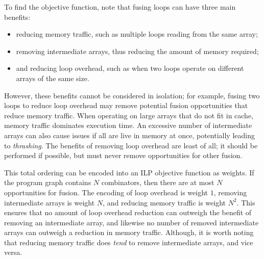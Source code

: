To find the objective function, note that fusing loops can have three main benefits:
\begin{itemize}
\item
reducing memory traffic, such as multiple loops reading from the same array;
\item
removing intermediate arrays, thus reducing the amount of memory required;
\item
and reducing loop overhead, such as when two loops operate on different arrays of the same size.
\end{itemize}
However, these benefits cannot be considered in isolation; for example, fusing two loops to reduce loop overhead may remove potential fusion opportunities that reduce memory traffic.
When operating on large arrays that do not fit in cache, memory traffic dominates execution time.
An excessive number of intermediate arrays can also cause issues if all are live in memory at once, potentially leading to \emph{thrashing}.
The benefits of removing loop overhead are least of all; it should be performed if possible, but must never remove opportunities for other fusion. 

This total ordering can be encoded into an ILP objective function as weights.
If the program graph contains $N$ combinators, then there are at most $N$ opportunities for fusion.
The encoding of loop overhead is weight $1$, removing intermediate arrays is weight $N$, and reducing memory traffic is weight $N^2$.
This ensures that no amount of loop overhead reduction can outweigh the benefit of removing an intermediate array,
and likewise no number of removed intermediate arrays can outweigh a reduction in memory traffic.
Although, it is worth noting that reducing memory traffic does \emph{tend} to remove intermediate arrays, and vice versa.


